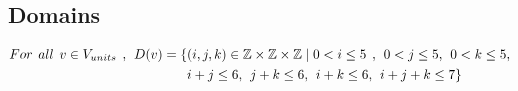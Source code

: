 \subsection{Domains}
\begin{align*}
For \hspace{1ex} all \hspace{1ex} v \in V_{units} \hspace{1ex},\hspace{1ex} D(v)=\{&(i,j,k) \in \mathbb{Z} \times \mathbb{Z}	\times \mathbb{Z} \mid  0<i \leq 5 \hspace{1ex} , \hspace{1ex} 0<j \leq 5,\hspace{1ex} 0<k \leq 5,\\& i+j\leq 6,\hspace{1ex} j+k\leq 6,\hspace{1ex}i+k\leq 6,\hspace{1ex}i+j+k\leq 7\}
\end{align*}
